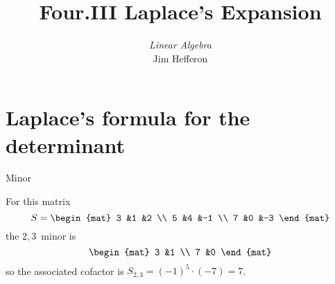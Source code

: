 \documentclass[10pt,t,serif,professionalfont]{beamer}
\title[Laplace's Expansion] %
{Four.III Laplace's Expansion}
\author{\textit{Linear Algebra} \\ {\small Jim Hef{}feron}}
\institute{
  \texttt{http://joshua.smcvt.edu/linearalgebra}
}
\date{}
\begin{document}
\begin{frame}
  \titlepage
\end{frame}




\section{Laplace's formula for the determinant}
\begin{frame}
\ex[ex:ExpThreeFirstRow]
\end{frame}
\begin{frame}
\end{frame}
\begin{frame}
\pause
{}
\end{frame}




\begin{frame}{Minor}
\df[df:Minor]

\pause
\ex For this matrix
\begin{equation*}
  S=
  \begin{mat}
    3 &1 &2 \\
    5 &4 &-1 \\
    7 &0 &-3
  \end{mat}
\end{equation*}
the $2,3$~minor is 
\begin{equation*}
  \begin{mat}
    3 &1 \\
    7 &0
  \end{mat}
\end{equation*}
so the associated cofactor is $S_{2,3}=(-1)^{5}\cdot (-7)=7$.
\end{frame}
\end{document}
